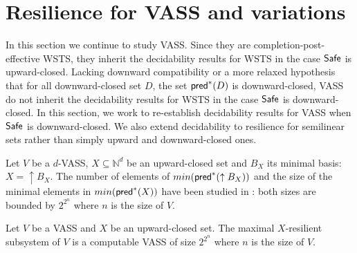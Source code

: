 
%

\section{Resilience for VASS and variations}\label{section VASS}

In this section we continue to study VASS. Since they are completion-post-effective WSTS, they inherit the decidability results for WSTS in the case 
$\textsf{Safe}$ is upward-closed. Lacking downward compatibility or a more relaxed hypothesis that
for all downward-closed set $D$, the set $\textsf{pred}^*(D)$ is downward-closed, 
VASS do not inherit the decidability results for WSTS in the case $\textsf{Safe}$ is downward-closed.
In this section, we work to re-establish decidability results for VASS when $\textsf{Safe}$ is downward-closed. We also extend decidability to resilience for semilinear sets rather than simply upward and downward-closed ones.

\iffalse
Let us recall that a {\em vector addition system with states (VASS)} in dimension $d$ ($d$-VASS for short) is a finite $\mathds{Z}^d$-labeled directed graph $V = (Q,T)$, where $Q$ is the set of {\em control-states}, and $T \subseteq Q \times \mathds{Z}^d \times Q$ is the set of {\em control-transitions}. 
%
Subsetquently, $Q \times \N^d$ is the set of configurations of the transition system associated with $V$.
For all configurations $p(\textbf{u}), q(\textbf{v}) \in Q \times \N^d$ and for every control-transition $t = (p, \textbf{z}, q)$ we write $p(\textbf{u}) \xrightarrow{t} q(\textbf{v})$ whenever $\textbf{v} = \textbf{u} + \textbf{z} \geq \textbf{0}$
%
When in the context of a $d$-VASS, we denote $0^d$ by $\textbf{0}$.
A {\em vector addition system (VAS)} in dimension $d$ ($d$-VAS for short) is a $d$-VASS where the set of control-states is a singleton.
\fi

\noindent

Let  $V$ be a $d$-VASS, $X \subseteq \mathds{N}^d$ be an upward-closed set and $B_X$ its minimal basis: $X=\uparrow B_X$. The number of elements of $min(\textsf{pred}^*(\uparrow B_X))$ and the size of the minimal elements in $min(\textsf{pred}^*(X))$ have been studied in
\cite{DBLP:conf/rp/BozzelliG11}: both sizes are bounded by $2^{2^n}$ where $n$ is the size of $V$.

\begin{theorem}{}
Let $V$ be a VASS and $X$ be an upward-closed set. The maximal $X$-resilient subsystem of $V$ is a computable VASS of size $2^{2^n}$ where $n$ is the size of $V$.
\end{theorem}

